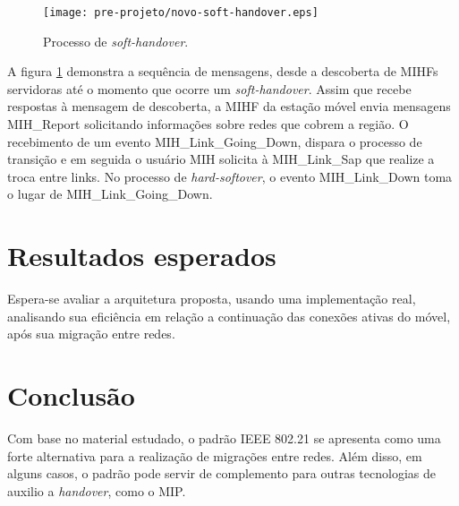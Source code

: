 \documentclass[12pt]{article}
\begin{document}
\begin{figure}[ht]
	\centering
	\texttt{[image: pre-projeto/novo-soft-handover.eps]}
	\caption{Processo de \textit{soft-handover}.}
	\label{fig:soft-handover}
\end{figure}

A figura \ref{fig:soft-handover} demonstra a sequência de mensagens, desde a 
descoberta de MIHFs servidoras até o momento que ocorre um 
\textit{soft-handover}. Assim que recebe respostas à mensagem de descoberta, a 
MIHF da estação móvel envia mensagens MIH\_Report solicitando informações 
sobre redes que cobrem a região. O recebimento de um evento 
MIH\_Link\_Going\_Down, dispara o processo de transição e em seguida o usuário 
MIH solicita à MIH\_Link\_Sap que realize a troca entre links. No processo de 
\textit{hard-softover}, o evento MIH\_Link\_Down toma o lugar de 
MIH\_Link\_Going\_Down.

\section{Resultados esperados} \label{sec:esperados} %

Espera-se avaliar a arquitetura proposta, usando uma implementação real, 
analisando sua eficiência em relação a continuação das conexões ativas do 
móvel, após sua migração entre redes.



\section{Conclusão} \label{sec:conclusao} %

Com base no material estudado, o padrão IEEE 802.21 se apresenta como uma 
forte alternativa para a realização de migrações entre redes. Além disso, em 
alguns casos, o padrão pode servir de complemento para outras tecnologias de 
auxilio a \textit{handover}, como o MIP.

\end{document}
